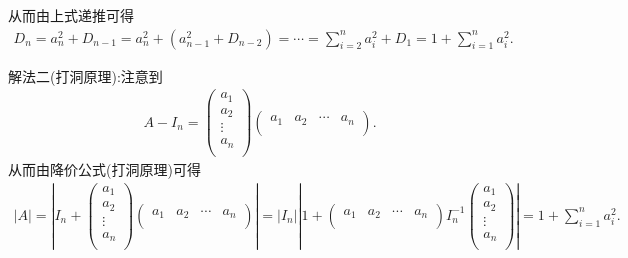 \documentclass[../../main.tex]{subfiles}%
\begin{document}
\begin{solution}
从而由上式递推可得
\begin{align*}
D_n=a_{n}^{2}+D_{n-1}=a_{n}^{2}+\left( a_{n-1}^{2}+D_{n-2} \right) =\cdots =\sum_{i=2}^n{a_{i}^{2}}+D_1=1+\sum_{i=1}^n{a_{i}^{2}}.
\end{align*}

{\color{blue}解法二(打洞原理):}注意到\begin{align*}
A-I_n=\left( \begin{array}{c}
a_1\\
a_2\\
\vdots\\
a_n\\
\end{array} \right) \left( \begin{matrix}
a_1&		a_2&		\cdots&		a_n\\
\end{matrix} \right) .
\end{align*}
从而由降价公式(打洞原理)可得\begin{align*}
\left| A \right|=\left| I_n+\left( \begin{array}{c}
a_1\\
a_2\\
\vdots\\
a_n\\
\end{array} \right) \left( \begin{matrix}
a_1&		a_2&		\cdots&		a_n\\
\end{matrix} \right) \right|=\left| I_n \right|\left| 1+\left( \begin{matrix}
a_1&		a_2&		\cdots&		a_n\\
\end{matrix} \right) I_{n}^{-1}\left( \begin{array}{c}
a_1\\
a_2\\
\vdots\\
a_n\\
\end{array} \right) \right|=1+\sum_{i=1}^n{a_{i}^{2}}.
\end{align*}

\end{solution}
\end{document}
